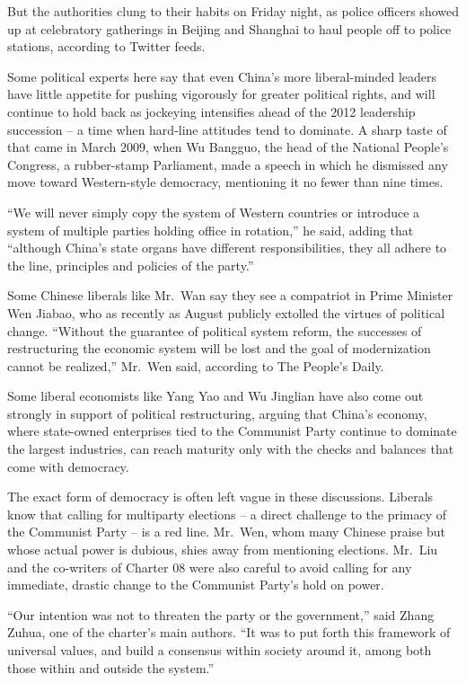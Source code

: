 ﻿\documentclass[12pt]{article}
\begin{document}
But the authorities clung to their habits on Friday night, as police officers showed up at
celebratory gatherings in Beijing and Shanghai to haul people off to police stations, according to
Twitter feeds.

Some political experts here say that even China's more liberal-minded leaders have little appetite
for pushing vigorously for greater political rights, and will continue to hold back as jockeying
intensifies ahead of the 2012 leadership succession -- a time when hard-line attitudes tend to
dominate. A sharp taste of that came in March 2009, when Wu Bangguo, the head of the National
People's Congress, a rubber-stamp Parliament, made a speech in which he dismissed any move toward
Western-style democracy, mentioning it no fewer than nine times.

``We will never simply copy the system of Western countries or introduce a system of multiple
parties holding office in rotation,'' he said, adding that ``although China's state organs have
different responsibilities, they all adhere to the line, principles and policies of the party.''

Some Chinese liberals like Mr.~Wan say they see a compatriot in Prime Minister Wen Jiabao, who as
recently as August publicly extolled the virtues of political change. ``Without the guarantee of
political system reform, the successes of restructuring the economic system will be lost and the
goal of modernization cannot be realized,'' Mr.~Wen said, according to The People's Daily.

Some liberal economists like Yang Yao and Wu Jinglian have also come out strongly in support of
political restructuring, arguing that China's economy, where state-owned enterprises tied to the
Communist Party continue to dominate the largest industries, can reach maturity only with the checks
and balances that come with democracy.

The exact form of democracy is often left vague in these discussions. Liberals know that calling for
multiparty elections -- a direct challenge to the primacy of the Communist Party -- is a red line.
Mr.~Wen, whom many Chinese praise but whose actual power is dubious, shies away from mentioning
elections. Mr.~Liu and the co-writers of Charter 08 were also careful to avoid calling for any
immediate, drastic change to the Communist Party's hold on power.

``Our intention was not to threaten the party or the government,'' said Zhang Zuhua, one of the
charter's main authors. ``It was to put forth this framework of universal values, and build a
consensus within society around it, among both those within and outside the system.''
\end{document}
